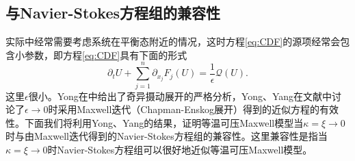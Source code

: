 	\subsection{与Navier-Stokes方程组的兼容性}%
	实际中经常需要考虑系统在平衡态附近的情况，这时方程\eqref{eq:CDF}的源项经常会包含小参数，即方程\eqref{eq:CDF}具有下面的形式
	\begin{equation}\label{eq:CDFSingular}
		\partial_t U + \sum_{j=1}^n \partial_{x_j} F_j(U) = \frac{1}{\epsilon}\mathcal{Q} (U) .
	\end{equation}
	这里$\epsilon$很小。Yong在\cite{yong1999singular}中给出了奇异摄动展开的严格分析，Yong、Yang在文献\cite{yang2015validity}中讨论了$\epsilon \rightarrow 0$时采用Maxwell迭代（Chapman-Enskog展开）得到的近似方程的有效性。下面我们将利用Yong、Yang的结果\cite{yang2015validity}，证明等温可压Maxwell模型当$\kappa=\xi \rightarrow 0$时与由Maxwell迭代得到的Navier-Stokes方程组的兼容性。这里兼容性是指当$\kappa=\xi \rightarrow 0$时Navier-Stokes方程组可以很好地近似等温可压Maxwell模型。

